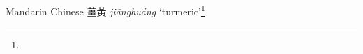 \begin{etymology}\label{ety:jianghuang}
Mandarin Chinese {薑黃} \textit{jiānghuáng} `turmeric'\footnote{}
\end{etymology}